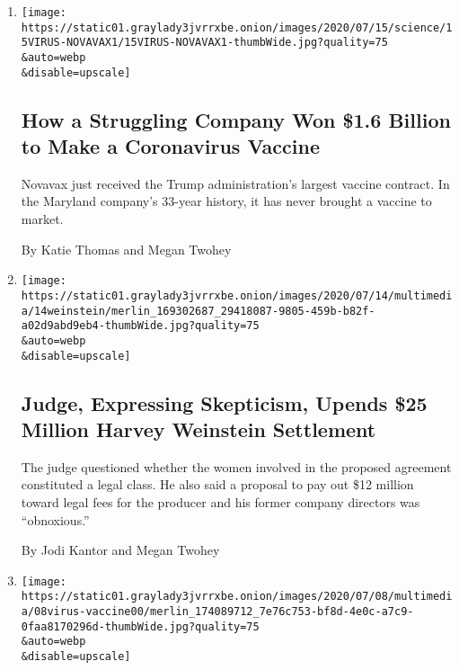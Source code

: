 \begin{enumerate}
\def\labelenumi{\arabic{enumi}.}
\item
  \href{/2020/07/16/health/coronavirus-vaccine-novavax.html}{}

  \texttt{[image: https://static01.graylady3jvrrxbe.onion/images/2020/07/15/science/15VIRUS-NOVAVAX1/15VIRUS-NOVAVAX1-thumbWide.jpg?quality=75\\\&auto=webp\\\&disable=upscale]}

  \hypertarget{how-a-struggling-company-won-16-billion-to-make-a-coronavirus-vaccine}{%
  \subsection{How a Struggling Company Won \$1.6 Billion to Make a
  Coronavirus
  Vaccine}\label{how-a-struggling-company-won-16-billion-to-make-a-coronavirus-vaccine}}

  Novavax just received the Trump administration's largest vaccine
  contract. In the Maryland company's 33-year history, it has never
  brought a vaccine to market.

  By Katie Thomas and Megan Twohey
\item
  \href{/2020/07/14/us/harvey-weinstein-settlement.html}{}

  \texttt{[image: https://static01.graylady3jvrrxbe.onion/images/2020/07/14/multimedia/14weinstein/merlin\_169302687\_29418087-9805-459b-b82f-a02d9abd9eb4-thumbWide.jpg?quality=75\\\&auto=webp\\\&disable=upscale]}

  \hypertarget{judge-expressing-skepticism-upends-25-million-harvey-weinstein-settlement}{%
  \subsection{Judge, Expressing Skepticism, Upends \$25 Million Harvey
  Weinstein
  Settlement}\label{judge-expressing-skepticism-upends-25-million-harvey-weinstein-settlement}}

  The judge questioned whether the women involved in the proposed
  agreement constituted a legal class. He also said a proposal to pay
  out \$12 million toward legal fees for the producer and his former
  company directors was ``obnoxious.''

  By Jodi Kantor and Megan Twohey
\item
  \href{/2020/07/09/us/coronavirus-vaccine.html}{}

  \texttt{[image: https://static01.graylady3jvrrxbe.onion/images/2020/07/08/multimedia/08virus-vaccine00/merlin\_174089712\_7e76c753-bf8d-4e0c-a7c9-0faa8170296d-thumbWide.jpg?quality=75\\\&auto=webp\\\&disable=upscale]}


\end{enumerate}
